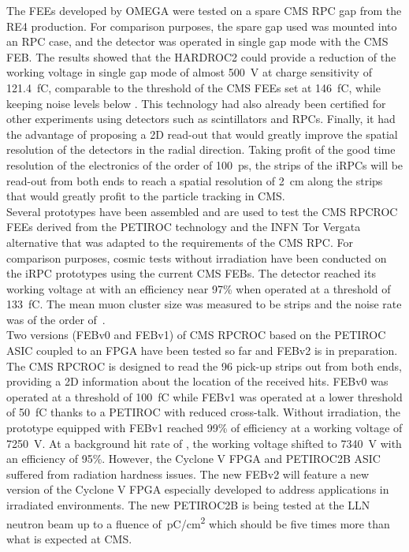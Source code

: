 	The FEEs developed by OMEGA were tested on a spare CMS RPC gap from the RE4 production. For comparison purposes, the spare gap used was mounted into an RPC case, and the detector was operated in single gap mode with the CMS FEB. The results showed that the HARDROC2 could provide a reduction of the working voltage in single gap mode of almost \SI{500}{V} at charge sensitivity of \SI{121.4}{fC}, comparable to the threshold of the CMS FEEs set at \SI{146}{fC}, while keeping noise levels below . This technology had also already been certified for other experiments using detectors such as scintillators and RPCs. Finally, it had the advantage of proposing a 2D read-out that would greatly improve the spatial resolution of the detectors in the radial direction. Taking profit of the good time resolution of the electronics of the order of \SI{100}{ps}, the strips of the iRPCs will be read-out from both ends to reach a spatial resolution of \SI{2}{cm} along the strips that would greatly profit to the particle tracking in CMS.\\
	Several prototypes have been assembled and are used to test the CMS RPCROC FEEs derived from the PETIROC technology and the INFN Tor Vergata alternative that was adapted to the requirements of the CMS RPC. For comparison purposes, cosmic tests without irradiation have been conducted on the iRPC prototypes using the current CMS FEBs. The detector reached its working voltage at  with an efficiency near 97\% when operated at a threshold of \SI{133}{fC}. The mean muon cluster size was measured to be  strips and the noise rate was of the order of \,\sirate.\\
	Two versions (FEBv0 and FEBv1) of CMS RPCROC based on the PETIROC ASIC coupled to an FPGA have been tested so far and FEBv2 is in preparation. The CMS RPCROC is designed to read the 96 pick-up strips out from both ends, providing a 2D information about the location of the received hits. FEBv0 was operated at a threshold of \SI{100}{fC} while FEBv1 was operated at a lower threshold of \SI{50}{fC} thanks to a PETIROC with reduced cross-talk. Without irradiation, the prototype equipped with FEBv1 reached 99\% of efficiency at a working voltage of \SI{7250}{V}. At a background hit rate of , the working voltage shifted to \SI{7340}{V} with an efficiency of 95\%. However, the Cyclone V FPGA and PETIROC2B ASIC suffered from radiation hardness issues. The new FEBv2 will feature a new version of the Cyclone V FPGA especially developed to address applications in irradiated environments. The new PETIROC2B is being tested at the \acf{LLN} neutron beam up to a fluence of \,\si{pC/cm^2} which should be five times more than what is expected at CMS.\\
